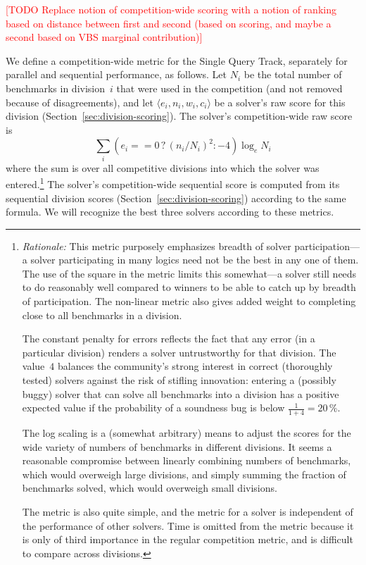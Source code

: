 \documentclass[12pt]{article}
\newcommand{\rem}[1]{\textcolor{red}{[#1]}}
\newcommand{\todo}[1]{\rem{TODO #1}}
\newcommand{\main}{Single Query\xspace}
\begin{document}
\todo{Replace notion of competition-wide scoring with a notion of ranking
based on distance between first and second (based on scoring, and maybe a second
based on VBS marginal contribution)}

We define a competition-wide metric for the \main Track, separately for
parallel and sequential performance, as follows.  Let $N_i$ be the
total number of benchmarks in division~$i$ that were used in the
competition (and not removed because of disagreements), and let
$\langle e_i, n_i, w_i, c_i\rangle$ be a solver's raw score for this
division (Section~\ref{sec:division-scoring}).  The solver's
competition-wide raw score is
%
$$\sum_i (e_i == 0 \,?\, (n_i/N_i)^2 : -4) \log_e N_i$$
%
where the sum is over all competitive divisions into which the solver
was entered.\footnote{\emph{Rationale:} This metric purposely
  emphasizes breadth of solver participation---a solver participating
  in many logics need not be the best in any one of them.  The use of
  the square in the metric limits this somewhat---a solver still needs
  to do reasonably well compared to winners to be able to catch up by
  breadth of participation.  The non-linear metric also gives added
  weight to completing close to all benchmarks in a division.

  The constant penalty for errors reflects the fact that any error (in
  a particular division) renders a solver untrustworthy for that
  division.  The value~$4$ balances the community's strong interest in
  correct (thoroughly tested) solvers against the risk of stifling
  innovation: entering a (possibly buggy) solver that can solve all
  benchmarks into a division has a positive expected value if the
  probability of a soundness bug is below $\frac{1}{1+4} = 20$\,\%.
  
  The log scaling is a (somewhat arbitrary) means to adjust the scores
  for the wide variety of numbers of benchmarks in different
  divisions.  It seems a reasonable compromise between linearly
  combining numbers of benchmarks, which would overweigh large
  divisions, and simply summing the fraction of benchmarks solved,
  which would overweigh small divisions.

  The metric is also quite simple, and the metric for a solver is
  independent of the performance of other solvers.  Time is omitted
  from the metric because it is only of third importance in the
  regular competition metric, and is difficult to compare across
  divisions.}  The solver's competition-wide sequential score is
computed from its sequential division scores
(Section~\ref{sec:division-scoring}) according to the same formula.
We will recognize the best three solvers according to these metrics.
\end{document}
